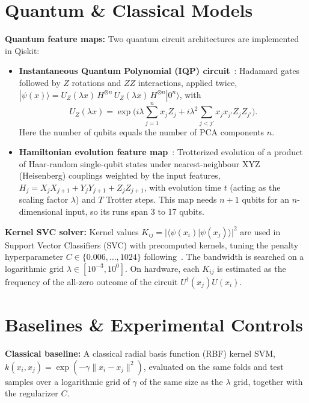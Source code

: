 \documentclass[conference]{IEEEtran}
\begin{document}
\section{Quantum \& Classical Models}
\textbf{Quantum feature maps:} Two quantum circuit architectures are implemented in Qiskit:
\begin{itemize}
\item \textbf{Instantaneous Quantum Polynomial (IQP) circuit}~\cite{havlicek2019supervised,shaydulin2022bandwidth}: Hadamard gates followed by $Z$ rotations and $ZZ$ interactions, applied twice, $|\psi(x)\rangle = U_Z(\lambda x)\,H^{\otimes n}\,U_Z(\lambda x)\,H^{\otimes n}|0^{n}\rangle$, with
\begin{equation}
U_Z(\lambda x)=\exp\Big(i\lambda\sum_{j=1}^{n}x_jZ_j+i\lambda^{2}\sum_{j<j'}x_jx_{j'}Z_jZ_{j'}\Big).
\end{equation}
Here the number of qubits equals the number of PCA components $n$.
\item \textbf{Hamiltonian evolution feature map}~\cite{huang2021power,shaydulin2022bandwidth}: Trotterized evolution of a product of Haar-random single-qubit states under nearest-neighbour XYZ (Heisenberg) couplings weighted by the input features, $H_j = X_jX_{j+1}+Y_jY_{j+1}+Z_jZ_{j+1}$, with evolution time $t$ (acting as the scaling factor $\lambda$) and $T$ Trotter steps. This map needs $n+1$ qubits for an $n$-dimensional input, so its runs span 3 to 17 qubits.
\end{itemize}

\textbf{Kernel SVC solver:} Kernel values $K_{ij}=|\langle\psi(x_i)|\psi(x_j)\rangle|^{2}$ are used in Support Vector Classifiers (SVC) with precomputed kernels, tuning the penalty hyperparameter $C\in\{0.006,\dots,1024\}$ following~\cite{shaydulin2022bandwidth}. The bandwidth is searched on a logarithmic grid $\lambda\in[10^{-3},10^{0}]$. On hardware, each $K_{ij}$ is estimated as the frequency of the all-zero outcome of the circuit $U^{\dagger}(x_j)U(x_i)$.

\section{Baselines \& Experimental Controls}
\textbf{Classical baseline:} A classical radial basis function (RBF) kernel SVM, $k(x_i,x_j)=\exp(-\gamma\|x_i-x_j\|^{2})$, evaluated on the same folds and test samples over a logarithmic grid of $\gamma$ of the same size as the $\lambda$ grid, together with the regularizer $C$.
\end{document}
